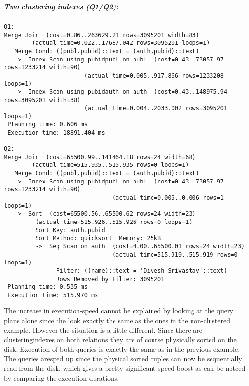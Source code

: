 \documentclass[11pt]{scrartcl}
\begin{document}
\\
\subparagraph{Two clustering indexes  (Q1/Q2):}
{\small
\begin{verbatim}
Q1:
Merge Join  (cost=0.86..263629.21 rows=3095201 width=83)
	    (actual time=0.022..17687.042 rows=3095201 loops=1)
   Merge Cond: ((publ.pubid)::text = (auth.pubid)::text)
   ->  Index Scan using pubidpubl on publ  (cost=0.43..73057.97 rows=1233214 width=90)
					   (actual time=0.005..917.866 rows=1233208 loops=1)
   ->  Index Scan using pubidauth on auth  (cost=0.43..148975.94 rows=3095201 width=38)
					   (actual time=0.004..2033.002 rows=3095201 loops=1)
 Planning time: 0.606 ms
 Execution time: 18891.404 ms

Q2:
Merge Join  (cost=65500.99..141464.18 rows=24 width=68)
	    (actual time=515.935..515.935 rows=0 loops=1)
   Merge Cond: ((publ.pubid)::text = (auth.pubid)::text)
   ->  Index Scan using pubidpubl on publ  (cost=0.43..73057.97 rows=1233214 width=90)
    				           (actual time=0.006..0.006 rows=1 loops=1)
   ->  Sort  (cost=65500.56..65500.62 rows=24 width=23)
	     (actual time=515.926..515.926 rows=0 loops=1)
         Sort Key: auth.pubid
         Sort Method: quicksort  Memory: 25kB
         ->  Seq Scan on auth  (cost=0.00..65500.01 rows=24 width=23)
                               (actual time=515.919..515.919 rows=0 loops=1)
               Filter: ((name)::text = 'Divesh Srivastav'::text)
               Rows Removed by Filter: 3095201
 Planning time: 0.535 ms
 Execution time: 515.970 ms
\end{verbatim}
The increase in execution-speed cannot be explained by looking at the query plans alone since the look exactly the same as the ones in the non-clustered example. However the situation is a little different.
Since there are clusteringindexes on both relations they are of course physically sorted on the disk. Execution of both queries is exactly the same as in the previous example.
The queries aresped up since the physical sorted tuples can now be sequentially read from the disk, which gives a pretty significant speed boost as can be notced by comparing the execution durations.
}
\end{document}

